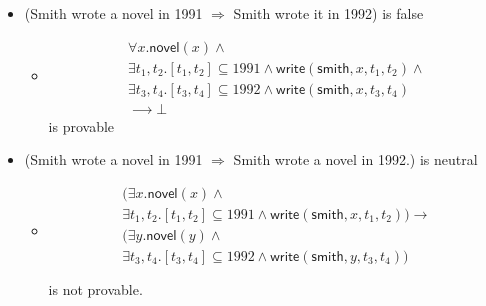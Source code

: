 \documentclass{beamer}
\newcommand\ConId[1]{\mathsf{#1}}
\begin{document}
\begin{frame}

\begin{itemize}
  \item (Smith wrote a novel in 1991 $⇒$ Smith wrote it in 1992) is false
    \begin{itemize}
    \item \[\begin{array}{l}
∀x. \ConId{novel}(x) ∧ \\
∃t_1,t_2.  [t_1,t_2] ⊆ 1991 ∧ \ConId {write}(\ConId{smith},x,t_1,t_2) ∧ \\
∃t_3,t_4.  [t_3,t_4] ⊆ 1992 ∧ \ConId {write}(\ConId{smith},x,t_3,t_4) \\
⟶ ⊥
\end{array}
\]
is provable
\end{itemize}
\item (Smith wrote a novel in 1991 $⇒$ Smith wrote a novel in 1992.) is neutral


  \begin{itemize}
  \item \[\begin{array}{l}
(∃x. \ConId{novel}(x) ∧ \\
∃t_1,t_2. [t_1,t_2] ⊆ 1991 ∧ \ConId{write}(\ConId{smith},x,t_1,t_2)) → \\
(∃y. \ConId{novel}(y) ∧ \\
∃t_3,t_4. [t_3,t_4] ⊆ 1992 ∧ \ConId{write}(\ConId{smith},y,t_3,t_4)) \\
 \\
\end{array}
\]
is not provable.
\end{itemize}
\end{itemize}

\end{frame}
\end{document}
